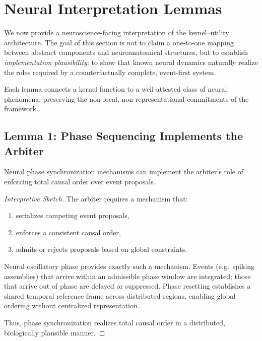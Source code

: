 \documentclass[11pt]{article}
\begin{document}
\section{Neural Interpretation Lemmas}
\label{sec:neural_lemmas}

We now provide a neuroscience-facing interpretation of the kernel--utility architecture. The goal of this section is not to claim a one-to-one mapping between abstract components and neuroanatomical structures, but to establish \emph{implementation plausibility}: to show that known neural dynamics naturally realize the roles required by a counterfactually complete, event-first system.

Each lemma connects a kernel function to a well-attested class of neural phenomena, preserving the non-local, non-representational commitments of the framework.

\subsection{Lemma 1: Phase Sequencing Implements the Arbiter}

\begin{lemma}
\label{lem:phase_arbiter}
Neural phase synchronization mechanisms can implement the arbiter’s role of enforcing total causal order over event proposals.
\end{lemma}

\begin{proof}[Interpretive Sketch]
The arbiter requires a mechanism that:
\begin{enumerate}
  \item serializes competing event proposals,
  \item enforces a consistent causal order,
  \item admits or rejects proposals based on global constraints.
\end{enumerate}

Neural oscillatory phase provides exactly such a mechanism. Events (e.g.\ spiking assemblies) that arrive within an admissible phase window are integrated; those that arrive out of phase are delayed or suppressed. Phase resetting establishes a shared temporal reference frame across distributed regions, enabling global ordering without centralized representation.

Thus, phase synchronization realizes total causal order in a distributed, biologically plausible manner.
\end{proof}
\end{document}
